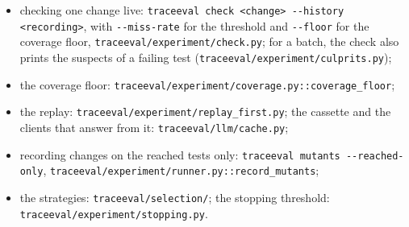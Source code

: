 \documentclass[11pt,a4paper]{article}
\begin{document}
\begin{itemize}
  \item checking one change live: \texttt{traceeval check <change> -{}-history <recording>}, with
        \texttt{-{}-miss-rate} for the threshold and \texttt{-{}-floor} for the coverage floor,
        \texttt{traceeval/experiment/check.py}; for a batch, the check also prints the suspects of a failing test
        (\texttt{traceeval/experiment/culprits.py});
  \item the coverage floor: \texttt{traceeval/experiment/coverage.py::coverage\_floor};
  \item the replay: \texttt{traceeval/experiment/replay\_first.py}; the cassette and the clients that answer from
        it: \texttt{traceeval/llm/cache.py};
  \item recording changes on the reached tests only: \texttt{traceeval mutants -{}-reached-only},
        \texttt{traceeval/experiment/runner.py::record\_mutants};
  \item the strategies: \texttt{traceeval/selection/}; the stopping threshold:
        \texttt{traceeval/experiment/stopping.py}.
\end{itemize}
\end{document}
